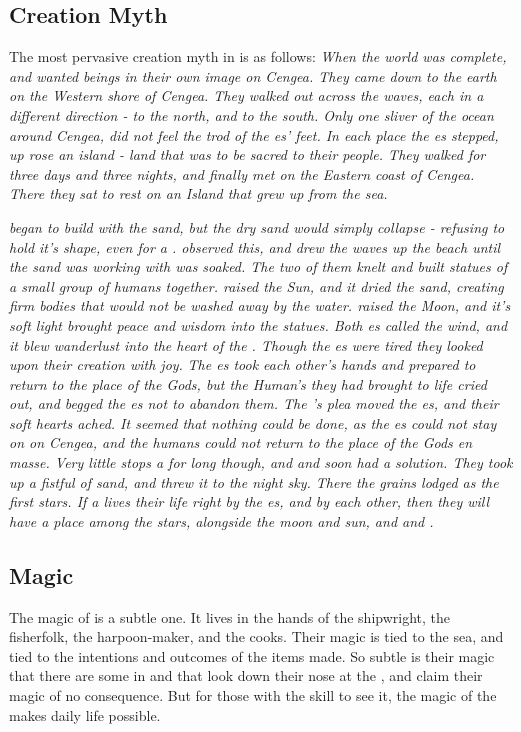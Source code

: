 \documentclass[blue]{GL2020}
\begin{document}
\subsection*{Creation Myth}
The most pervasive creation myth in \pShip{} is as follows:
\emph{When the world was complete, \cEbb{} and \cFlow{} wanted beings in their own image on Cengea. They came down to the earth on the Western shore of Cengea. They walked out across the waves, each in a different direction - \cEbb{} to the north, and \cFlow{} to the south. Only one sliver of the ocean around Cengea, \pWod{} did not feel the trod of the \cEbb{\God}es' feet. In each place the \cEbb{\God}es stepped, up rose an island - land that was to be sacred to their people. They walked for three days and three nights, and finally met on the Eastern coast of Cengea. There they sat to rest on an Island that grew up from the sea.}

\emph{\cFlow{} began to build with the sand, but the dry sand would simply collapse - refusing to hold it's shape, even for a \cFlow{\God}. \cEbb{} observed this, and drew the waves up the beach until the sand \cFlow{} was working with was soaked. The two of them knelt and built statues of a small group of humans together. \cFlow{} raised the Sun, and it dried the sand, creating firm bodies that would not be washed away by the water. \cEbb{} raised the Moon, and it's soft light brought peace and wisdom into the statues. Both \cEbb{\God}es called the wind, and it blew wanderlust into the heart of the \pShippies{}. Though the \cEbb{\God}es were tired they looked upon their creation with joy.}
\emph{The \cEbb{\God}es took each other's hands and prepared to return to the place of the Gods, but the Human's they had brought to life cried out, and begged the \cEbb{\God}es not to abandon them. The \pShippies{}'s plea moved the \cEbb{\God}es, and their soft hearts ached. It seemed that nothing could be done, as the \cEbb{\God}es could not stay on on Cengea, and the humans could not return to the place of the Gods en masse. Very little stops a \cEbb{\God} for long though, and \cEbb{} and \cFlow{} soon had a solution. They took up a fistful of sand, and threw it to the night sky. There the grains lodged as the first stars. If a \pShippies{} lives their life right by the \cEbb{\God}es, and by each other, then they will have a place among the stars, alongside the moon and sun, and \cEbb{} and \cFlow{}.}

\subsection*{Magic}
The magic of \pShip{} is a subtle one. It lives in the hands of the shipwright, the fisherfolk, the harpoon-maker, and the cooks. Their magic is tied to the sea, and tied to the intentions and outcomes of the items made. So subtle is their magic that there are some in \pFarm{} and \pTech{} that look down their nose at the \pShippies{}, and claim their magic of no consequence. But for those with the skill to see it, the magic of the \pShippies{} makes daily life possible.
\end{document}
